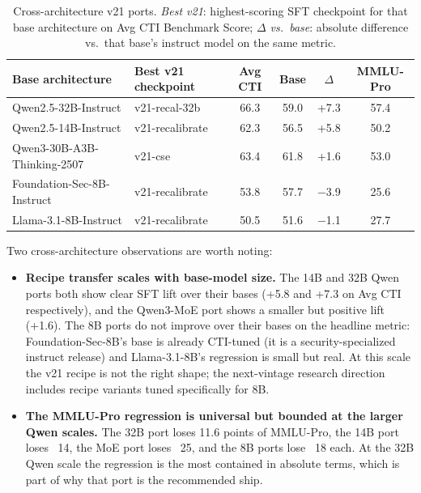 \documentclass[unnumsec,webpdf,contemporary,large]{oup-authoring-template}
\theoremstyle{thmstyleone}
\theoremstyle{thmstyletwo}
\theoremstyle{thmstylethree}
\begin{document}
\begin{table}[t]
\centering
\caption{Cross-architecture v21 ports. \emph{Best v21}: highest-scoring SFT checkpoint for that base architecture on Avg CTI Benchmark Score; \emph{$\Delta$ vs.\ base}: absolute difference vs.\ that base's instruct model on the same metric.}
\label{tab:results-architectures}
\small
\begin{tabular}{llcccc}
\hline
\textbf{Base architecture} & \textbf{Best v21 checkpoint} & \textbf{Avg CTI} & \textbf{Base} & \textbf{$\Delta$} & \textbf{MMLU-Pro} \\
\hline
Qwen2.5-32B-Instruct        & v21-recal-32b   & 66.3 & 59.0 & +7.3 & 57.4 \\
Qwen2.5-14B-Instruct        & v21-recalibrate & 62.3 & 56.5 & +5.8 & 50.2 \\
Qwen3-30B-A3B-Thinking-2507 & v21-cse         & 63.4 & 61.8 & +1.6 & 53.0 \\
Foundation-Sec-8B-Instruct  & v21-recalibrate & 53.8 & 57.7 & $-$3.9 & 25.6 \\
Llama-3.1-8B-Instruct       & v21-recalibrate & 50.5 & 51.6 & $-$1.1 & 27.7 \\
\hline
\end{tabular}
\end{table}

Two cross-architecture observations are worth noting:

\begin{itemize}
  \item \textbf{Recipe transfer scales with base-model size.} The 14B and 32B Qwen ports both show clear SFT lift over their bases (+5.8 and +7.3 on Avg CTI respectively), and the Qwen3-MoE port shows a smaller but positive lift (+1.6). The 8B ports do not improve over their bases on the headline metric: Foundation-Sec-8B's base is already CTI-tuned (it is a security-specialized instruct release) and Llama-3.1-8B's regression is small but real. At this scale the v21 recipe is not the right shape; the next-vintage research direction includes recipe variants tuned specifically for 8B.
  \item \textbf{The MMLU-Pro regression is universal but bounded at the larger Qwen scales.} The 32B port loses 11.6 points of MMLU-Pro, the 14B port loses ~14, the MoE port loses ~25, and the 8B ports lose ~18 each. At the 32B Qwen scale the regression is the most contained in absolute terms, which is part of why that port is the recommended ship.
\end{itemize}
\end{document}
